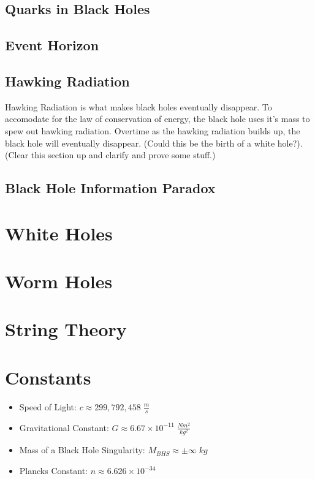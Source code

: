 \documentclass{article}
\begin{document}
\subsection{Quarks in Black Holes}


\subsection{Event Horizon}


\subsection{Hawking Radiation}
Hawking Radiation is what makes black holes eventually disappear. To accomodate for the law of conservation of energy, the black hole uses it's mass to spew out hawking radiation. Overtime as the hawking radiation builds up, the black hole will eventually disappear. (Could this be the birth of a white hole?). (Clear this section up and clarify and prove some stuff.)

\subsection{Black Hole Information Paradox}




\section{White Holes}




\section{Worm Holes}



\section{String Theory}



\section{Constants}\label{sec:constants}
\begin{itemize}
    \item Speed of Light: $c \approx 299,792,458\;\frac{m}{s}$
    \item Gravitational Constant: $G \approx 6.67 \times 10^{-11}\;\frac{Nm^2}{kg^2}$
    \item Mass of a Black Hole Singularity: $M_{BHS} \approx \pm \infty\;kg$
    \item Plancks Constant: $n \approx 6.626 \times 10^{-34}$
\end{itemize}
\end{document}
